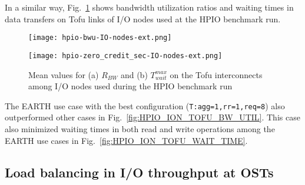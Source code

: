 \documentclass{jhps}
\begin{document}
In a similar way, Fig.~\ref{fig:HPIO_ION_TOFU_BWU_WAIT_TIME} shows
bandwidth utilization ratios and waiting times in data transfers
on Tofu links of I/O nodes used at the HPIO benchmark run.
%
\begin{figure}[tb]
\centering
\begin{minipage}[t]{0.48\textwidth}
 \centering
 \texttt{[image: hpio-bwu-IO-nodes-ext.png]}
 \label{fig:HPIO_ION_TOFU_BW_UTIL}
\end{minipage}
%
\noindent
\begin{minipage}[t]{0.48\textwidth}
 \centering
 \texttt{[image: hpio-zero\_credit\_sec-IO-nodes-ext.png]}
 \label{fig:HPIO_ION_TOFU_WAIT_TIME}
\end{minipage}
\caption{Mean values for (a) $R_{BW}$ and (b) $T_{wait}^{max}$ on the Tofu interconnects
among I/O nodes used during the HPIO benchmark run}
\label{fig:HPIO_ION_TOFU_BWU_WAIT_TIME}
\end{figure}
%
The EARTH use case with the best configuration ({\tt T:agg=1,rr=1,req=8}) also
outperformed other cases in
Fig.~\ref{fig:HPIO_ION_TOFU_BW_UTIL}.
This case also minimized waiting times in both read and write operations
among the EARTH use cases in Fig.~\ref{fig:HPIO_ION_TOFU_WAIT_TIME}.

\subsection{Load balancing in I/O throughput at OSTs}
\end{document}
